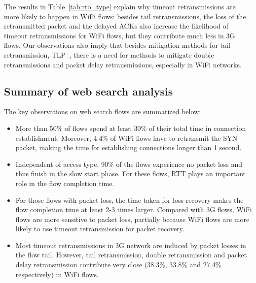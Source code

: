 The results in Table~\ref{tab:rto_type} explain why timeout retransmissions are more likely to happen in WiFi flows: besides tail retransmissions, the loss of the retransmitted packet and the delayed ACKs also increase the likelihood of timeout retransmissions for WiFi flows, but they contribute much less in 3G flows. Our observations also imply that besides mitigation methods for tail retransmission, \eg TLP~\cite{flach2013reducing}, there is a need for methods to mitigate double retransmissions and packet delay retransmissions, especially in WiFi networks.

\subsection{Summary of web search analysis}

The key observations on web search flows are summarized below:

\begin{itemize}

\item More than 50\% of flows spend at least 30\% of their total time in connection establishment. Moreover, 4.4\% of WiFi flows have to retransmit the SYN packet, making the time for establishing connections longer than 1 second.
	
\item Independent of access type, 90\% of the flows experience no packet loss and thus finish in the slow start phase. For these flows,  RTT plays an important role in the flow completion time. %
	
\item For those flows with packet loss, the time taken for loss recovery makes the flow completion time at least 2-3 times larger. Compared with 3G flows, WiFi flows are more sensitive to packet loss, partially because WiFi flows are more likely to use timeout retransmission for packet recovery. 
	
\item Most timeout retransmissions in 3G network are induced by packet losses in the flow tail. However, tail retransmission, double retransmission and packet delay retransmission contribute very close (38.3\%, 33.8\% and 27.4\% respectively) in WiFi flows. 
	
\end{itemize}